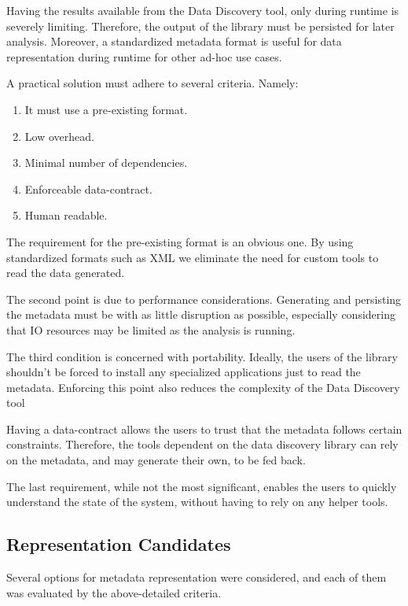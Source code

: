 Having the results available from the Data Discovery tool, only during runtime is severely limiting.
Therefore, the output of the library must be persisted for later analysis.
Moreover, a standardized
metadata format is useful for data representation during runtime for other ad-hoc use cases.
\newline

A practical solution must adhere to several criteria.
Namely:
\begin{enumerate}
    \item It must use a pre-existing format.
    \item Low overhead.
    \item Minimal number of dependencies.
    \item Enforceable data-contract.
    \item Human readable.
\end{enumerate}

The requirement for the pre-existing format is an obvious one.
By using standardized formats such as XML we eliminate the need for custom tools to read the
data generated.

The second point is due to performance considerations.
Generating and persisting the metadata must be
with as little disruption as possible, especially considering that IO resources may be limited as the
analysis is running.

The third condition is concerned with portability.
Ideally, the users of the library shouldn't be
forced to install any specialized applications just to read the metadata.
Enforcing this point also reduces the complexity of the Data Discovery tool

Having a data-contract allows the users to trust that the metadata follows certain constraints.
Therefore, the tools dependent on the data discovery library can rely on the metadata, and may generate their own,
to be fed back.

The last requirement, while not the most significant, enables the users to quickly understand the
state of the system, without having to rely on any helper tools.

\subsection{Representation Candidates}

Several options for metadata representation were considered, and each of them was evaluated by the above-detailed criteria.

